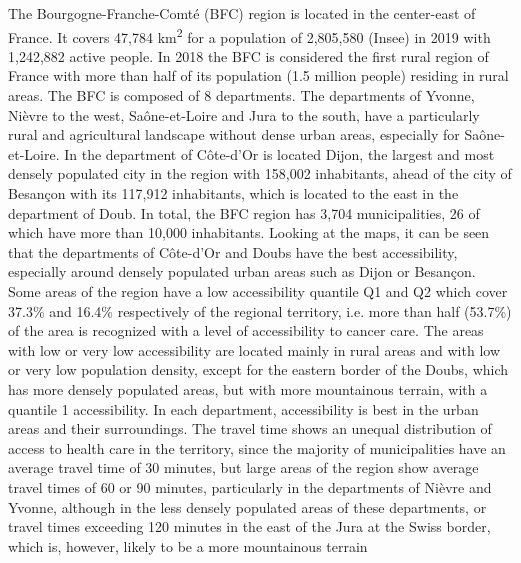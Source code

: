 The Bourgogne-Franche-Comté (BFC) region is located in the center-east of
France. It covers 47,784 km\textsuperscript{2} for a population of 2,805,580
(Insee) in 2019 with 1,242,882 active people. In 2018 the BFC is considered the
first rural region of France with more than half of its population (1.5 million
people) residing in rural areas. The BFC is composed of 8 departments. The
departments of Yvonne, Nièvre to the west, Saône-et-Loire and Jura to the south,
have a particularly rural and agricultural landscape without dense urban areas,
especially for Saône-et-Loire.  In the department of Côte-d'Or is located Dijon,
the largest and most densely populated city in the region with 158,002
inhabitants, ahead of the city of Besançon with its 117,912 inhabitants, which
is located to the east in the department of Doub. In total, the BFC region has
3,704 municipalities, 26 of which have more than 10,000 inhabitants. Looking at
the maps, it can be seen that the departments of Côte-d'Or and Doubs have the
best accessibility, especially around densely populated urban areas such as
Dijon or Besançon. Some areas of the region have a low
accessibility quantile Q1 and Q2 which cover 37.3\% and 16.4\% respectively
of the regional territory, i.e. more than half (53.7\%) of the area
is recognized with a level of accessibility to cancer care. The areas with low
or very low accessibility are located mainly in rural areas and with low or very
low population density, except for the eastern border of the Doubs, which has
more densely populated areas, but with more mountainous terrain, with a quantile
1 accessibility. In each department, accessibility is best in the urban areas
and their surroundings. The travel time shows an unequal distribution of access
to health care in the territory, since the majority of municipalities have an
average travel time of 30 minutes, but large areas of the region show average
travel times of 60 or 90 minutes, particularly in the departments of Nièvre and
Yvonne, although in the less densely populated areas of these departments, or
travel times exceeding 120 minutes in the east of the Jura at the Swiss border,
which is, however, likely to be a more mountainous terrain

